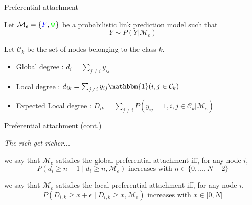 \begin{frame}[c]{Preferential attachment}


    \begin{definition}[Degrees]
    Let $\mathcal{M}_e = \{ \textcolor{blue}{F}, \textcolor{green}{\Phi} \}$ be a probabilistic link prediction model such that 
    \[Y\sim P(Y|\mathcal{M}_e) \]

    Let $\mathcal{C}_k$ be the set of nodes belonging to the class $k$.

    \begin{itemize}
    \item Global degree : $d_i  = \sum_{j\neq i} y_{ij}$
    \item Local degree :  $d_{ik}  = \sum_{j\neq i} y_{ij} \mathbbm{1}(i,j\in \mathcal{C}_k)$
    \item Expected Local degree :  $D_{ik}  = \sum_{j\neq i} P(y_{ij}=1, i,j\in \mathcal{C}_k | \mathcal{M}_e) $
    \end{itemize}
    \end{definition}





\end{frame}


\begin{frame}[c]{Preferential attachment (cont.)}

\emph{The rich get richer...}
\vspace{2em}

\begin{definition}
we say that $\mathcal{M}_e$ satisfies the global preferential attachment iff, for any node $i$, 
\[P(d_i \ge n+1 \mid d_i \ge n, \mathcal{M}_e) \textrm{ increases with } n \in \{0,..., N-2\} \]
\end{definition}

\begin{definition}
we say that  $\mathcal{M}_e$ satisfies the local preferential attachment iff, for any node $i$, 
\[P(D_{i,k} \ge x+\epsilon \mid D_{i,k} \ge x, \mathcal{M}_e) \textrm{ increases with } x \in [0,N[ \]
\end{definition}

\end{frame}



